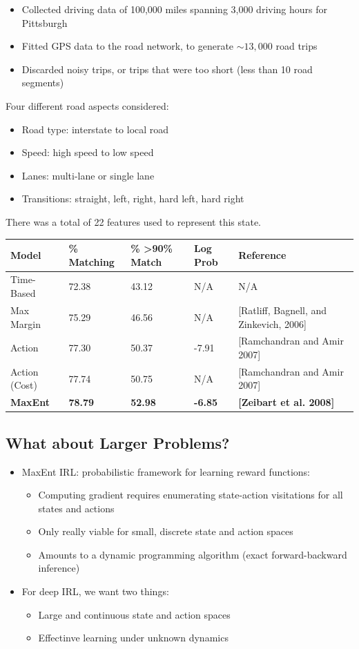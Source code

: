 \documentclass[10pt]{article}
\begin{document}
\begin{itemize}
	\item Collected driving data of 100,000 miles spanning 3,000 driving hours for Pittsburgh
	\item Fitted GPS data to the road network, to generate $\sim 13,000$ road trips
	\item Discarded noisy trips, or trips that were too short (less than 10 road segments)
\end{itemize}
Four different road aspects considered:
\begin{itemize}
	\item Road type: interstate to local road
	\item Speed: high speed to low speed
	\item Lanes: multi-lane or single lane
	\item Transitions: straight, left, right, hard left, hard right
\end{itemize}
There was a total of 22 features used to represent this state.
\begin{center} 
	\begin{tabular}{lllll}
        Model & \% Matching & \% \textgreater{}90\% Match & Log Prob & Reference \\ \hline
        Time-Based & 72.38 & 43.12 & N/A & N/A \\
        Max Margin & 75.29 & 46.56 & N/A & {[}Ratliff, Bagnell, and Zinkevich, 2006{]} \\
        Action & 77.30 & 50.37 & -7.91 & {[}Ramchandran and Amir 2007{]} \\
        Action (Cost) & 77.74 & 50.75 & N/A & {[}Ramchandran and Amir 2007{]} \\
        \textbf{MaxEnt} & \textbf{78.79} & \textbf{52.98} & \textbf{-6.85} & \textbf{{[}Zeibart et al. 2008{]}}
        \end{tabular}
\end{center}

\subsection*{What about Larger Problems?}
\begin{itemize}
	\item MaxEnt IRL: probabilistic framework for learning reward functions:
	\begin{itemize}
        \item Computing gradient requires enumerating state-action visitations for all states and actions
        \item Only really viable for small, discrete state and action spaces
        \item Amounts to a dynamic programming algorithm (exact forward-backward inference)
    \end{itemize}
	\item For deep IRL, we want two things:
	\begin{itemize}
        \item Large and continuous state and action spaces
        \item Effectinve learning under unknown dynamics
    \end{itemize}
\end{itemize}
\end{document}
